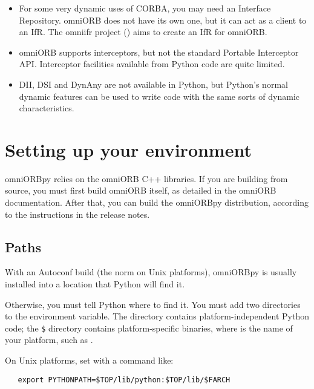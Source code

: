 \documentclass[11pt,oneside,a4paper]{book}
\begin{document}
\begin{itemize}

\item For some very dynamic uses of CORBA, you may need an Interface
  Repository. omniORB does not have its own one, but it can act as a
  client to an IfR. The omniifr project
  () aims to create an IfR
  for omniORB.

\item omniORB supports interceptors, but not the standard Portable
  Interceptor API. Interceptor facilities available from Python code
  are quite limited.

\item DII, DSI and DynAny are not available in Python, but Python's
  normal dynamic features can be used to write code with the same
  sorts of dynamic characteristics.

\end{itemize}



\section{Setting up your environment}
\label{sec:setup}

omniORBpy relies on the omniORB C++ libraries. If you are building
from source, you must first build omniORB itself, as detailed in the
omniORB documentation. After that, you can build the omniORBpy
distribution, according to the instructions in the release notes.


\subsection{Paths}

With an Autoconf build (the norm on Unix platforms), omniORBpy is
usually installed into a location that Python will find it.

Otherwise, you must tell Python where to find it. You must add two
directories to the  environment variable. The
 directory contains platform-independent Python code;
the \texttt{\$} directory contains
platform-specific binaries, where  is the name of
your platform, such as .

On Unix platforms, set  with a command like:

\begin{verbatim}
   export PYTHONPATH=$TOP/lib/python:$TOP/lib/$FARCH
\end{verbatim}
\end{document}
